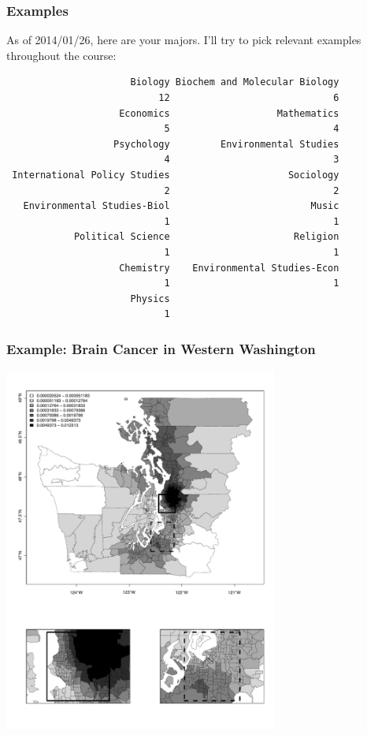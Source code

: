 \documentclass[slides]{beamer}\usepackage[]{graphicx}\usepackage[]{color}
\begin{document}
\begin{frame}[fragile]
\frametitle{Examples}
As of 2014/01/26, here are your majors.  I'll try to pick relevant examples throughout the course:

\begin{small}
\begin{verbatim}
                      Biology Biochem and Molecular Biology 
                           12                             6 
                    Economics                   Mathematics 
                            5                             4 
                   Psychology         Environmental Studies 
                            4                             3 
 International Policy Studies                     Sociology 
                            2                             2 
   Environmental Studies-Biol                         Music 
                            1                             1 
            Political Science                      Religion 
                            1                             1 
                    Chemistry    Environmental Studies-Econ 
                            1                             1 
                      Physics 
                            1 
\end{verbatim}
\end{small}
\end{frame}


\begin{frame}[fragile]
\frametitle{Example: Brain Cancer in Western Washington}
\begin{center}
\includegraphics[width=9cm]{figure/brain_post_high}
\end{center}
\end{frame}
\end{document}
